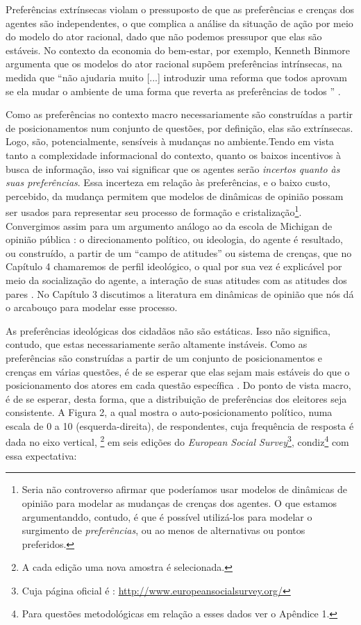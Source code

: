 Preferências extrínsecas violam o pressuposto de que as preferências e crenças
dos agentes são independentes, o que complica a análise da situação de ação por
meio do modelo do ator racional, dado que não podemos pressupor que elas são
estáveis. No contexto da economia do bem-estar, por exemplo,
Kenneth Binmore argumenta que os modelos do ator racional supõem
preferências intrínsecas, na medida que ``não ajudaria muito [...] introduzir uma
reforma que todos aprovam se ela mudar o ambiente de uma forma que reverta as
preferências de todos '' \cite[p.6]{binmore2008rational}.

Como as preferências no contexto macro necessariamente são construídas a partir
de posicionamentos num conjunto de questões, por definição, elas são
extrínsecas. Logo, são, potencialmente, sensíveis à mudanças no ambiente.Tendo
em vista tanto a complexidade informacional do contexto, quanto os baixos
incentivos à busca de informação, isso vai significar que os agentes serão
\textit{incertos quanto às suas preferências}. Essa incerteza em relação às
preferências, e o baixo custo, percebido, da mudança permitem que modelos de
dinâmicas de opinião possam ser usados para representar seu processo de formação
e cristalização\footnote{Seria não controverso afirmar que poderíamos usar
  modelos de dinâmicas de opinião para modelar as mudanças de crenças dos
  agentes. O que estamos argumentanddo, contudo, é que é  possível utilizá-los para
  modelar o surgimento de \textit{preferências}, ou ao menos de alternativas ou
  pontos preferidos.}. Convergimos assim para um argumento análogo ao da escola
de Michigan de opinião pública : o direcionamento político, ou ideologia, do
agente é resultado, ou construído, a partir de um ``campo de atitudes'' ou
sistema de crenças, que no Capítulo 4 chamaremos de perfil ideológico, o qual
por sua vez é explicável por meio da socialização do agente, a interação de suas
atitudes com as atitudes dos pares \cite{figueiredo2008decisao}. No Capítulo 3
discutimos a literatura em dinâmicas de opinião que nós dá o arcabouço para
modelar esse processo.

As preferências ideológicas dos cidadãos não são estáticas. Isso não significa,
contudo, que estas necessariamente serão altamente instáveis. Como as
preferências são construídas a partir de um conjunto de posicionamentos e
crenças em várias questões, é de se esperar que elas sejam mais estáveis do que
o posicionamento dos atores em cada questão específica
\cite{druckman2012public}. Do ponto de vista macro, é de se esperar, desta
forma, que a distribuição de preferências dos eleitores seja consistente. A
Figura 2, a qual mostra o auto-posicionamento político, numa escala de 0 a 10
(esquerda-direita), de respondentes, cuja frequência de resposta é dada no eixo
vertical, \footnote{A cada edição uma nova amostra é selecionada.} em seis
edições do \textit{European Social Survey}\footnote{Cuja página oficial é :
  \url{http://www.europeansocialsurvey.org/}}, condiz\footnote{Para questões
  metodológicas em relação a esses dados ver o Apêndice 1.} com essa
expectativa:

